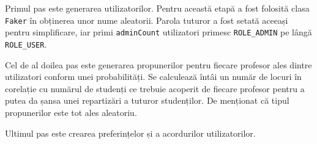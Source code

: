 Primul pas este generarea utilizatorilor. Pentru această etapă a fost folosită clasa \texttt{Faker} în obținerea unor nume aleatorii. Parola tuturor a fost setată aceeași pentru simplificare, iar primi \texttt{adminCount} utilizatori primesc \texttt{ROLE\_ADMIN} pe lângă \texttt{ROLE\_USER}.

Cel de al doilea pas este generarea propunerilor pentru fiecare profesor ales dintre utilizatori conform unei probabilități. Se calculează întâi un număr de locuri în corelație cu numărul de studenți ce trebuie acoperit de fiecare profesor pentru a putea da șansa unei repartizări a tuturor studenților. De menționat că tipul propunerilor este tot ales aleatoriu.

Ultimul pas este crearea preferințelor și a acordurilor utilizatorilor.